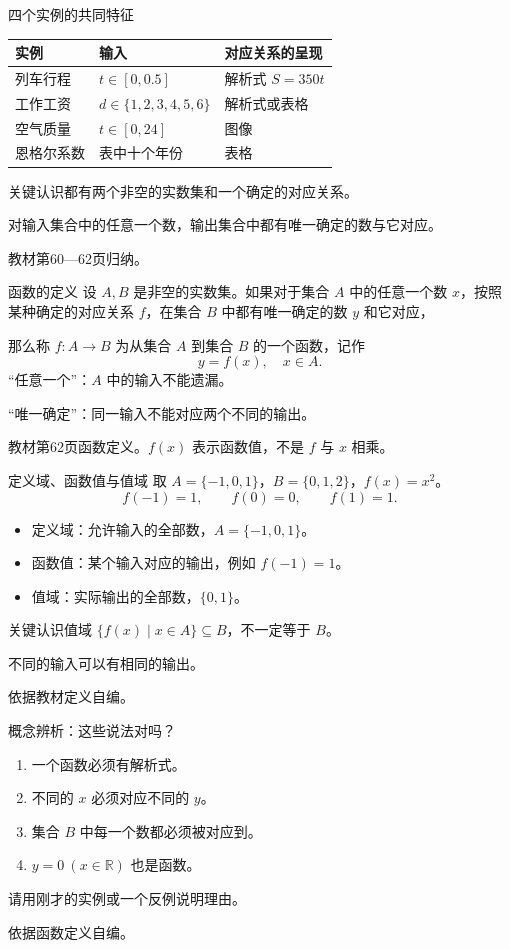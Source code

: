 \documentclass[aspectratio=169,10pt]{beamer}
\newcommand{\R}{\mathbb R}
\newcommand{\src}[1]{\par\vfill{\tiny\color{gray}#1}}
\newcommand{\key}[1]{\begin{block}{关键认识}#1\end{block}}
\begin{document}
\begin{frame}[t]{四个实例的共同特征}
\begin{center}\small
\begin{tabular}{lll}
\toprule
实例&输入&对应关系的呈现\\\midrule
列车行程&$t\in[0,0.5]$&解析式 $S=350t$\\
工作工资&$d\in\{1,2,3,4,5,6\}$&解析式或表格\\
空气质量&$t\in[0,24]$&图像\\
恩格尔系数&表中十个年份&表格\\\bottomrule
\end{tabular}
\end{center}
\key{都有两个非空的实数集和一个确定的对应关系。\par
对输入集合中的任意一个数，输出集合中都有唯一确定的数与它对应。}
\src{教材第60—62页归纳。}
\end{frame}
\begin{frame}[t]{函数的定义}
设 $A,B$ 是\alert{非空的实数集}。如果对于集合 $A$ 中的\alert{任意一个}数 $x$，按照某种确定的对应关系 $f$，在集合 $B$ 中都有\alert{唯一确定}的数 $y$ 和它对应，\par\medskip
那么称 $f:A\to B$ 为从集合 $A$ 到集合 $B$ 的一个函数，记作
\[\boxed{y=f(x),\quad x\in A.}\]
\medskip
“任意一个”：$A$ 中的输入不能遗漏。\par
“唯一确定”：同一输入不能对应两个不同的输出。
\src{教材第62页函数定义。$f(x)$ 表示函数值，不是 $f$ 与 $x$ 相乘。}
\end{frame}
\begin{frame}[t]{定义域、函数值与值域}
取 $A=\{-1,0,1\}$，$B=\{0,1,2\}$，$f(x)=x^2$。
\[f(-1)=1,\qquad f(0)=0,\qquad f(1)=1.\]
\begin{itemize}
\item 定义域：允许输入的全部数，$A=\{-1,0,1\}$。
\item 函数值：某个输入对应的输出，例如 $f(-1)=1$。
\item 值域：实际输出的全部数，$\{0,1\}$。
\end{itemize}
\key{值域 $\{f(x)\mid x\in A\}\subseteq B$，不一定等于 $B$。\par
不同的输入可以有相同的输出。}
\src{依据教材定义自编。}
\end{frame}
\begin{frame}[t]{概念辨析：这些说法对吗？}
\begin{enumerate}
\item 一个函数必须有解析式。
\item 不同的 $x$ 必须对应不同的 $y$。
\item 集合 $B$ 中每一个数都必须被对应到。
\item $y=0\ (x\in\R)$ 也是函数。
\end{enumerate}
\bigskip
请用刚才的实例或一个反例说明理由。
\src{依据函数定义自编。}
\end{frame}
\end{document}
